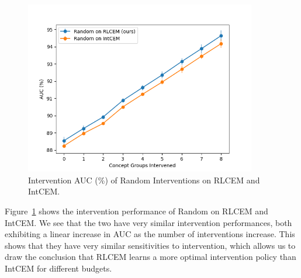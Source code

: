 \begin{figure}[!h]
    \centering
    \includegraphics[width=0.9\textwidth]{figs/evaluation/mnist_performance_random_off.png}
    \caption{
        Intervention AUC (\%) of Random Interventions on RLCEM and IntCEM.
    }
    \label{fig:mnist-random-off}
\end{figure}

Figure~\ref{fig:mnist-random-off} shows the intervention performance of Random
on RLCEM and IntCEM. We see that the two have very similar intervention performances,
both exhibiting a linear increase in AUC as the number of interventions increase.
This shows that they have very similar sensitivities to intervention, which 
allows us to draw the conclusion that RLCEM learns a more optimal
intervention policy 
than IntCEM for different budgets.

